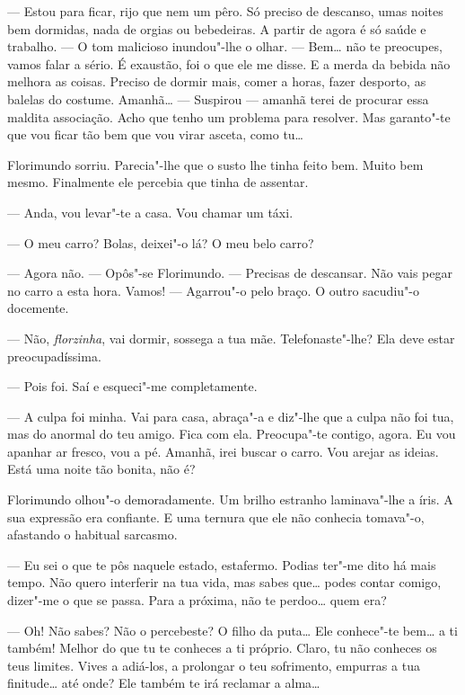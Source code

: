 --- Estou para ficar, rijo que nem um pêro. Só preciso de descanso, umas
noites bem dormidas, nada de orgias ou bebedeiras. A partir de agora é
só saúde e trabalho. --- O tom malicioso inundou"-lhe o olhar. --- Bem\ldots{} não
te preocupes, vamos falar a sério. É exaustão, foi o que ele me disse. E
a merda da bebida não melhora as coisas. Preciso de dormir mais, comer a
horas, fazer desporto, as balelas do costume. Amanhã\ldots{} --- Suspirou ---
amanhã terei de procurar essa maldita associação. Acho que tenho um
problema para resolver. Mas garanto"-te que vou ficar tão bem que vou
virar asceta, como tu\ldots{}

Florimundo sorriu. Parecia"-lhe que o susto lhe tinha feito bem. Muito
bem mesmo. Finalmente ele percebia que tinha de assentar.

--- Anda, vou levar"-te a casa. Vou chamar um táxi.

--- O meu carro? Bolas, deixei"-o lá? O meu belo carro?

--- Agora não. --- Opôs"-se Florimundo. --- Precisas de descansar. Não vais
pegar no carro a esta hora. Vamos! --- Agarrou"-o pelo braço. O outro
sacudiu"-o docemente.

--- Não, \emph{florzinha}, vai dormir, sossega a tua mãe. Telefonaste"-lhe? Ela
deve estar preocupadíssima.

--- Pois foi. Saí e esqueci"-me completamente.

--- A culpa foi minha. Vai para casa, abraça"-a e diz"-lhe que a culpa não
foi tua, mas do anormal do teu amigo. Fica com ela. Preocupa"-te contigo,
agora. Eu vou apanhar ar fresco, vou a pé. Amanhã, irei buscar o carro.
Vou arejar as ideias. Está uma noite tão bonita, não é?

Florimundo olhou"-o demoradamente. Um brilho estranho laminava"-lhe a
íris. A sua expressão era confiante. E uma ternura que ele não conhecia
tomava"-o, afastando o habitual sarcasmo.

--- Eu sei o que te pôs naquele estado, estafermo. Podias ter"-me dito há
mais tempo. Não quero interferir na tua vida, mas sabes que\ldots{} podes
contar comigo, dizer"-me o que se passa. Para a próxima, não te
perdoo\ldots{} quem era?

--- Oh! Não sabes? Não o percebeste? O filho da puta\ldots{} Ele conhece"-te
bem\ldots{} a ti também! Melhor do que tu te conheces a ti próprio. Claro, tu
não conheces os teus limites. Vives a adiá-los, a prolongar o teu
sofrimento, empurras a tua finitude\ldots{} até onde? Ele também te irá
reclamar a alma\ldots{}


